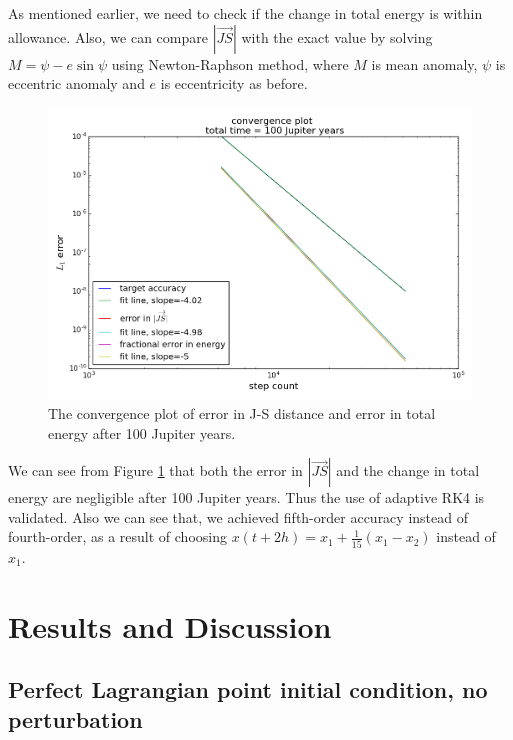 \documentclass[12pt,a4paper]{article}
\begin{document}
	
	
As mentioned earlier, we need to check if the change in total energy is within allowance. Also, we can compare $|\overrightarrow{JS}|$ with the exact value   by solving $M = \psi - e \sin{\psi} $ using Newton-Raphson method, where $M$ is mean anomaly, $\psi$ is eccentric anomaly and $e$ is eccentricity as before.

\begin{figure}[H]
\centering
\includegraphics[width=6in]{figure_6_100v_100orbits.png} 
\caption{The convergence plot of error in J-S distance and error in total energy after 100 Jupiter years.}
\label{fig:convergence}
\end{figure}
	
We can see from Figure \ref{fig:convergence} that both the error in $|\overrightarrow{JS}|$ and the change in total energy are negligible after 100 Jupiter years. Thus the use of adaptive RK4 is validated. Also we can see that, we achieved fifth-order accuracy instead of fourth-order, as a result of choosing $x(t+2h) = x_1 + \frac{1}{15}(x_1-x_2)$ instead of $x_1$.


\section{Results and Discussion}

\subsection{Perfect Lagrangian point initial condition, no perturbation}
\end{document}
